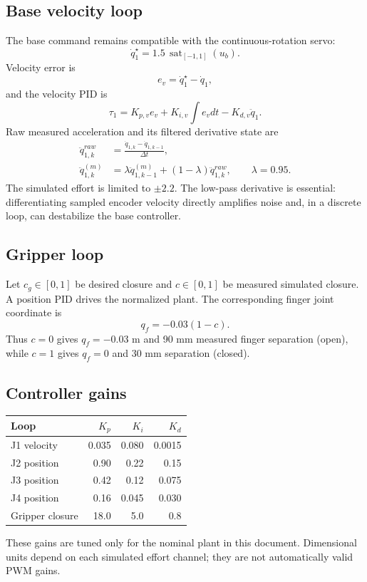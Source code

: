\documentclass[11pt,a4paper]{article}
\newcommand{\sat}[2]{\operatorname{sat}_{#1}\!\left(#2\right)}
\begin{document}
\subsection{Base velocity loop}
The base command remains compatible with the continuous-rotation servo:
\[
\dot q_1^{\star}=1.5\,\sat{[-1,1]}{u_b}.
\]
Velocity error is
\[
e_v=\dot q_1^{\star}-\dot q_1,
\]
and the velocity PID is
\[
\tau_1=K_{p,v}e_v+K_{i,v}\int e_vdt-K_{d,v}\ddot q_1.
\]
Raw measured acceleration and its filtered derivative state are
\begin{align}
\ddot q_{1,k}^{raw}&=\frac{\dot q_{1,k}-\dot q_{1,k-1}}{\Delta t},\\
\ddot q_{1,k}^{(m)}&=\lambda\ddot q_{1,k-1}^{(m)}
 +(1-\lambda)\ddot q_{1,k}^{raw},\qquad \lambda=0.95.
\end{align}
The simulated effort is limited to $\pm2.2$. The low-pass derivative is
essential: differentiating sampled encoder velocity directly amplifies noise
and, in a discrete loop, can destabilize the base controller.

\subsection{Gripper loop}
Let $c_g\in[0,1]$ be desired closure and $c\in[0,1]$ be measured simulated
closure. A position PID drives the normalized plant. The corresponding finger
joint coordinate is
\begin{equation}
q_f=-0.03(1-c).
\end{equation}
Thus $c=0$ gives $q_f=-0.03$ m and 90 mm measured finger separation (open),
while $c=1$ gives $q_f=0$ and 30 mm separation (closed).

\subsection{Controller gains}
\begin{table}[h]
\centering
\begin{tabular}{lrrr}
\toprule Loop & $K_p$ & $K_i$ & $K_d$\\\midrule
J1 velocity & 0.035 & 0.080 & 0.0015\\
J2 position & 0.90 & 0.22 & 0.15\\
J3 position & 0.42 & 0.12 & 0.075\\
J4 position & 0.16 & 0.045 & 0.030\\
Gripper closure & 18.0 & 5.0 & 0.8\\\bottomrule
\end{tabular}
\end{table}
These gains are tuned only for the nominal plant in this document. Dimensional
units depend on each simulated effort channel; they are not automatically valid
PWM gains.
\end{document}
